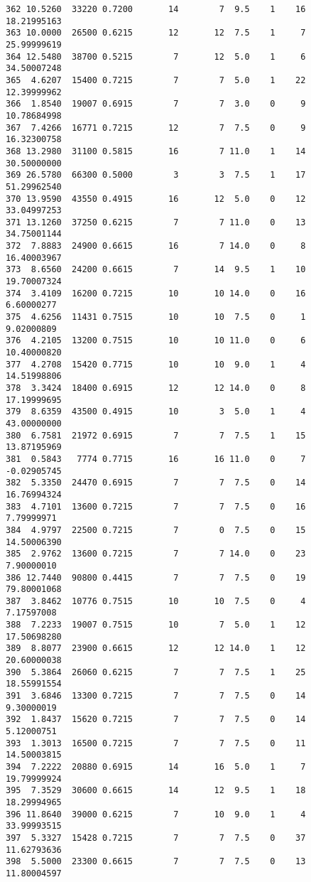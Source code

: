 \documentclass[
  letterpaper,
  DIV=11,
  numbers=noendperiod]{scrreprt}
\begin{document}
\begin{verbatim}
362 10.5260  33220 0.7200       14        7  9.5    1    16 18.21995163
363 10.0000  26500 0.6215       12       12  7.5    1     7 25.99999619
364 12.5480  38700 0.5215        7       12  5.0    1     6 34.50007248
365  4.6207  15400 0.7215        7        7  5.0    1    22 12.39999962
366  1.8540  19007 0.6915        7        7  3.0    0     9 10.78684998
367  7.4266  16771 0.7215       12        7  7.5    0     9 16.32300758
368 13.2980  31100 0.5815       16        7 11.0    1    14 30.50000000
369 26.5780  66300 0.5000        3        3  7.5    1    17 51.29962540
370 13.9590  43550 0.4915       16       12  5.0    0    12 33.04997253
371 13.1260  37250 0.6215        7        7 11.0    0    13 34.75001144
372  7.8883  24900 0.6615       16        7 14.0    0     8 16.40003967
373  8.6560  24200 0.6615        7       14  9.5    1    10 19.70007324
374  3.4109  16200 0.7215       10       10 14.0    0    16  6.60000277
375  4.6256  11431 0.7515       10       10  7.5    0     1  9.02000809
376  4.2105  13200 0.7515       10       10 11.0    0     6 10.40000820
377  4.2708  15420 0.7715       10       10  9.0    1     4 14.51998806
378  3.3424  18400 0.6915       12       12 14.0    0     8 17.19999695
379  8.6359  43500 0.4915       10        3  5.0    1     4 43.00000000
380  6.7581  21972 0.6915        7        7  7.5    1    15 13.87195969
381  0.5843   7774 0.7715       16       16 11.0    0     7 -0.02905745
382  5.3350  24470 0.6915        7        7  7.5    0    14 16.76994324
383  4.7101  13600 0.7215        7        7  7.5    0    16  7.79999971
384  4.9797  22500 0.7215        7        0  7.5    0    15 14.50006390
385  2.9762  13600 0.7215        7        7 14.0    0    23  7.90000010
386 12.7440  90800 0.4415        7        7  7.5    0    19 79.80001068
387  3.8462  10776 0.7515       10       10  7.5    0     4  7.17597008
388  7.2233  19007 0.7515       10        7  5.0    1    12 17.50698280
389  8.8077  23900 0.6615       12       12 14.0    1    12 20.60000038
390  5.3864  26060 0.6215        7        7  7.5    1    25 18.55991554
391  3.6846  13300 0.7215        7        7  7.5    0    14  9.30000019
392  1.8437  15620 0.7215        7        7  7.5    0    14  5.12000751
393  1.3013  16500 0.7215        7        7  7.5    0    11 14.50003815
394  7.2222  20880 0.6915       14       16  5.0    1     7 19.79999924
395  7.3529  30600 0.6615       14       12  9.5    1    18 18.29994965
396 11.8640  39000 0.6215        7       10  9.0    1     4 33.99993515
397  5.3327  15428 0.7215        7        7  7.5    0    37 11.62793636
398  5.5000  23300 0.6615        7        7  7.5    0    13 11.80004597

\end{verbatim}
\end{document}
